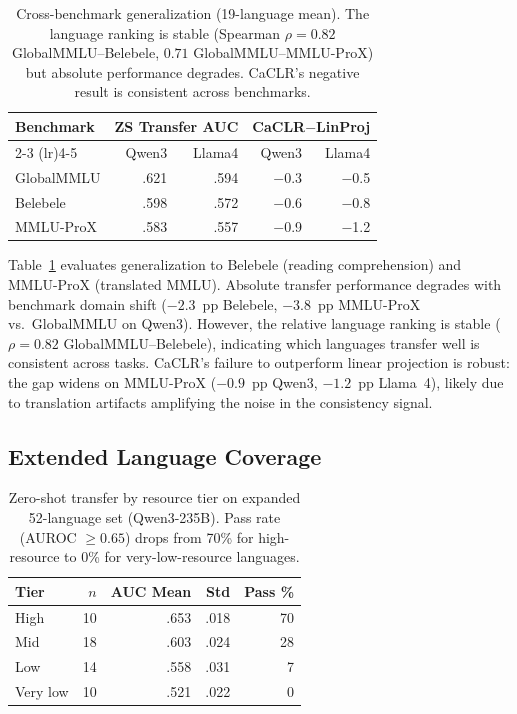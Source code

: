 \documentclass[11pt,a4paper]{article}
\begin{document}
\begin{table}[t]
\centering
\small
\begin{tabular}{lrrrr}
\toprule
\textbf{Benchmark} & \multicolumn{2}{c}{\textbf{ZS Transfer AUC}} & \multicolumn{2}{c}{\textbf{CaCLR$-$LinProj}} \\
\cmidrule(lr){2-3} \cmidrule(lr){4-5}
& Qwen3 & Llama4 & Qwen3 & Llama4 \\
\midrule
GlobalMMLU & .621 & .594 & $-$0.3 & $-$0.5 \\
Belebele   & .598 & .572 & $-$0.6 & $-$0.8 \\
MMLU-ProX  & .583 & .557 & $-$0.9 & $-$1.2 \\
\bottomrule
\end{tabular}
\caption{Cross-benchmark generalization (19-language mean). The language ranking is stable (Spearman $\rho{=}0.82$ GlobalMMLU--Belebele, $0.71$ GlobalMMLU--MMLU-ProX) but absolute performance degrades. CaCLR's negative result is consistent across benchmarks.}
\label{tab:cross_benchmark}
\end{table}

Table~\ref{tab:cross_benchmark} evaluates generalization to Belebele (reading comprehension) and MMLU-ProX (translated MMLU).
Absolute transfer performance degrades with benchmark domain shift ($-2.3$~pp Belebele, $-3.8$~pp MMLU-ProX vs.\ GlobalMMLU on Qwen3).
However, the relative language ranking is stable ($\rho{=}0.82$ GlobalMMLU--Belebele), indicating which languages transfer well is consistent across tasks.
CaCLR's failure to outperform linear projection is robust: the gap widens on MMLU-ProX ($-0.9$~pp Qwen3, $-1.2$~pp Llama~4), likely due to translation artifacts amplifying the noise in the consistency signal.

\subsection{Extended Language Coverage}

\begin{table}[t]
\centering
\small
\begin{tabular}{lrrrr}
\toprule
\textbf{Tier} & $n$ & \textbf{AUC Mean} & \textbf{Std} & \textbf{Pass \%} \\
\midrule
High     & 10 & .653 & .018 & 70 \\
Mid      & 18 & .603 & .024 & 28 \\
Low      & 14 & .558 & .031 & 7 \\
Very low & 10 & .521 & .022 & 0 \\
\bottomrule
\end{tabular}
\caption{Zero-shot transfer by resource tier on expanded 52-language set (Qwen3-235B). Pass rate (AUROC $\geq 0.65$) drops from 70\% for high-resource to 0\% for very-low-resource languages.}
\label{tab:extended_langs}
\end{table}
\end{document}
